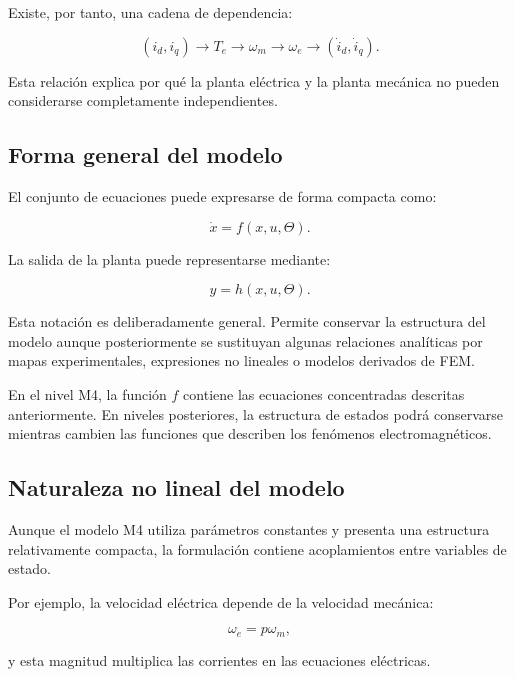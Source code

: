 Existe, por tanto, una cadena de dependencia:

\begin{equation}
(i_d,i_q)
\rightarrow
T_e
\rightarrow
\omega_m
\rightarrow
\omega_e
\rightarrow
(\dot{i}_d,\dot{i}_q).
\end{equation}

Esta relación explica por qué la planta eléctrica y la planta mecánica no pueden considerarse completamente independientes.

\subsection{Forma general del modelo}

El conjunto de ecuaciones puede expresarse de forma compacta como:

\begin{equation}
\dot{x}=f(x,u,\Theta).
\end{equation}

La salida de la planta puede representarse mediante:

\begin{equation}
y=h(x,u,\Theta).
\end{equation}

Esta notación es deliberadamente general. Permite conservar la estructura del modelo aunque posteriormente se sustituyan algunas relaciones analíticas por mapas experimentales, expresiones no lineales o modelos derivados de FEM.

En el nivel M4, la función $f$ contiene las ecuaciones concentradas descritas anteriormente. En niveles posteriores, la estructura de estados podrá conservarse mientras cambien las funciones que describen los fenómenos electromagnéticos.

\subsection{Naturaleza no lineal del modelo}

Aunque el modelo M4 utiliza parámetros constantes y presenta una estructura relativamente compacta, la formulación contiene acoplamientos entre variables de estado.

Por ejemplo, la velocidad eléctrica depende de la velocidad mecánica:

\begin{equation}
\omega_e=p\omega_m,
\end{equation}

y esta magnitud multiplica las corrientes en las ecuaciones eléctricas.

